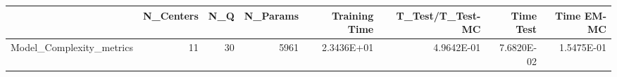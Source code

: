 \begin{tabular}{lrrrrrrr}
\toprule
{} &  N\_Centers &  N\_Q &  N\_Params &  Training Time &  T\_Test/T\_Test-MC &  Time Test &  Time EM-MC \\
\midrule
Model\_Complexity\_metrics &         11 &   30 &      5961 &     2.3436E+01 &        4.9642E-01 & 7.6820E-02 &  1.5475E-01 \\
\bottomrule
\end{tabular}

